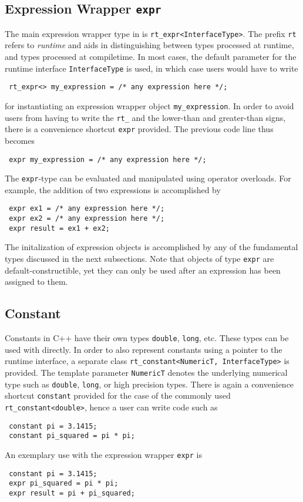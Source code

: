  \subsection{Expression Wrapper \lstinline|expr|}
The main expression wrapper type in {\ViennaMath} is \lstinline|rt_expr<InterfaceType>|.
The prefix \lstinline|rt| refers to \emph{runtime} and aids in distinguishing between types processed at runtime, and types processed at compiletime.
In most cases, the default parameter for the runtime interface \lstinline|InterfaceType| is used, in which case users would have to write
\begin{lstlisting}
 rt_expr<> my_expression = /* any expression here */;
\end{lstlisting}
for instantiating an expression wrapper object \lstinline|my_expression|.
In order to avoid users from having to write the \lstinline|rt_| and the lower-than and greater-than signs,
there is a convenience shortcut \lstinline|expr| provided. The previous code line thus becomes
\begin{lstlisting}
 expr my_expression = /* any expression here */;
\end{lstlisting}
The \lstinline|expr|-type can be evaluated and manipulated using operator overloads.
For example, the addition of two expressions is accomplished by
\begin{lstlisting}
 expr ex1 = /* any expression here */;
 expr ex2 = /* any expression here */;
 expr result = ex1 + ex2;
\end{lstlisting}
The initalization of expression objects is accomplished by any of the fundamental types discussed in the next subsections.
Note that objects of type \lstinline|expr| are default-constructible, yet they can only be used after an expression has been assigned to them.


 \subsection{Constant}
Constants in C++ have their own types \lstinline|double|, \lstinline|long|, etc.
These types can be used with {\ViennaMath} directly. 
In order to also represent constants using a pointer to the runtime interface, a separate class \lstinline|rt_constant<NumericT, InterfaceType>| is provided.
The template parameter \lstinline|NumericT| denotes the underlying numerical type such as \lstinline|double|, \lstinline|long|, or high precision types.
There is again a convenience shortcut \lstinline|constant| provided for the case of the commonly used \lstinline|rt_constant<double>|, hence a user can write code such as
\begin{lstlisting}
 constant pi = 3.1415;
 constant pi_squared = pi * pi;
\end{lstlisting}
An exemplary use with the expression wrapper \lstinline|expr| is
\begin{lstlisting}
 constant pi = 3.1415;
 expr pi_squared = pi * pi;
 expr result = pi + pi_squared;
\end{lstlisting}

